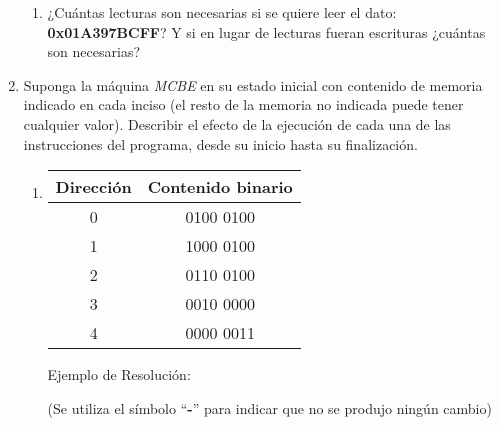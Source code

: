 \documentclass[12pt]{article}
\begin{document}
\begin{enumerate}
\begin{enumerate}
            \item ¿Cuántas lecturas son necesarias si se quiere leer el dato:
                \textbf{0x01A397BCFF}? Y si en lugar de lecturas fueran
                escrituras ¿cuántas son necesarias?

        \end{enumerate}

    \item Suponga la máquina \emph{MCBE} en su estado inicial con contenido de
        memoria indicado en cada inciso (el resto de la memoria no indicada
        puede tener cualquier valor).  Describir el efecto de la ejecución de
        cada una de las instrucciones del programa, desde su inicio hasta su
        finalización.

        \begin{enumerate}

            \item \begin{tabular}{| c | c |}
                    \hline
                    \textbf{Dirección}&\textbf{Contenido binario}\\
                    \hline \hline
                    0 & 0100 0100\\
                    \hline
                    1 & 1000 0100\\
                    \hline
                    2 & 0110 0100\\
                    \hline
                    3 & 0010 0000\\
                    \hline
                    4 & 0000 0011\\
                    \hline
            \end{tabular}

            Ejemplo de Resolución:
            
            {\tiny(Se utiliza el símbolo ``\textbf{-}'' para indicar que no se
                produjo ningún cambio)}
                

\end{enumerate}
\end{enumerate}
\end{document}
